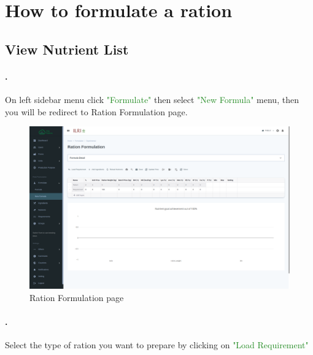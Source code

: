 \section{How to formulate a ration}
\subsection{View Nutrient  List}\label{sec:nutrient_list}
\setcounter{stepcounter}{1}
\paragraph{.}On left sidebar menu click \textcolor{ForestGreen}{"Formulate"} then select \textcolor{ForestGreen}{"New Formula"} menu, then you will be redirect to Ration Formulation page.

\begin{figure}[h!]
  	\includegraphics[width=15cm]{screenshots/ration_formulation_page.png}
  	\caption{Ration Formulation page}
  	\label{fig:ration_formulation_page}
\end{figure}

\paragraph{.} Select the type of ration you want to prepare by clicking on \textcolor{ForestGreen}{"Load Requirement"}

